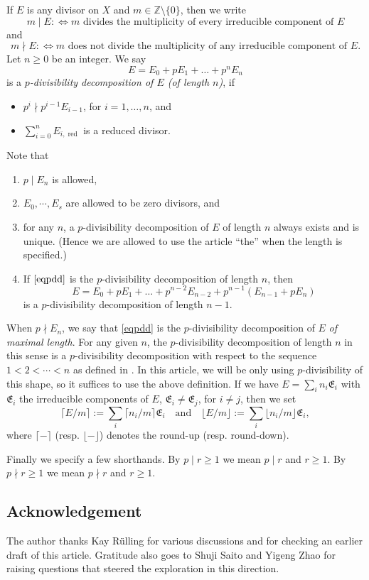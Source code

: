 \documentclass[11pt]{amsart}
\newcommand{\eq}[2]{\begin{equation}\label{#1}#2 \end{equation}}
\newcommand{\Z}{\mathbb{Z}}
\newcommand{\sE}{\mathfrak{E}}
\newcommand{\red}{{\operatorname{red}}}
\theoremstyle{plain}
\theoremstyle{definition}
\numberwithin{equation}{prop}
\begin{document}
If $E$ is any divisor on $X$ and $m\in \Z\setminus\{0\}$, then we write
\[m \mid E :\Longleftrightarrow  m \text{ divides the multiplicity of every irreducible component of } E\]
and 
\[m\nmid E :\Longleftrightarrow m \text{ does not divide the multiplicity of any irreducible component of } E.\]
Let $n\ge 0$ be an integer.
We say
\eq{eqpdd}{E= E_0 + pE_{1}+\ldots + p^{n}E_{n}
}
is a {\em $p$-divisibility decomposition  of $E$ (of length $n$)}, if
\begin{itemize} 
\item 
$p^{i}\nmid p^{i-1}E_{i-1}$, for $i=1,\ldots, n$, 
and 
\item 
$\sum_{i=0}^n E_{i,\red}$ is a reduced divisor.
\end{itemize}
Note that 
\begin{enumerate}
\item 
$p\mid E_{n}$ is allowed,
\item 
$E_0,\cdots, E_s$ are allowed to be zero divisors, and
\item 
for any $n$, a $p$-divisibility decomposition of $E$ of length $n$ always exists and is unique. (Hence we are allowed to use the article ``the'' when the length is specified.)
\item 
If $\eqref{eqpdd}$ is the $p$-divisibility decomposition of length $n$, then
\eq{eqpddn-1}{E= E_0 + p E_{1}+\ldots +p^{n-2}E_{n-2}+ p^{n-1}(E_{n-1}+pE_{n})
}
is a $p$-divisibility decomposition of length $n-1$.
\end{enumerate}
When $p\nmid E_n$, we say that \eqref{eqpdd} is the $p$-divisibility decomposition of $E$ \textit{of maximal length}.
For any given $n$, the $p$-divisibility decomposition of length $n$ in this sense is a $p$-divisibility decomposition with respect to the sequence $1<2<\cdots<n$ as defined in \cite{RamFil1}.
In this article, we will be only using $p$-divisibility of this shape, so it suffices to use the above definition.
If we have
$E=\sum_i n_i \sE_i$ with $\sE_i$ the irreducible components of $E$, $\sE_i\neq\sE_j$, for $i\neq j$,
then we set
\[\lceil E/m\rceil:= \sum_i \lceil n_i/m\rceil \sE_i \quad \text{and} \quad \lfloor E/m\rfloor:= \sum_i \lfloor n_i/m\rfloor \sE_i,\]
where $\lceil - \rceil$ (resp. $\lfloor -\rfloor$) denotes the  round-up (resp. round-down).

Finally we specify a few shorthands. By $p\mid r\ge 1$ we mean $p\mid r$ and $r\ge 1$. By $p\nmid r\ge 1$ we mean $p\nmid r$ and $r\ge 1$.

\subsection*{Acknowledgement}
The author thanks Kay R\"ulling for various discussions and for checking an earlier draft of this article. 
Gratitude also goes to Shuji Saito and Yigeng Zhao for raising questions that steered the exploration in this direction.
\end{document}
